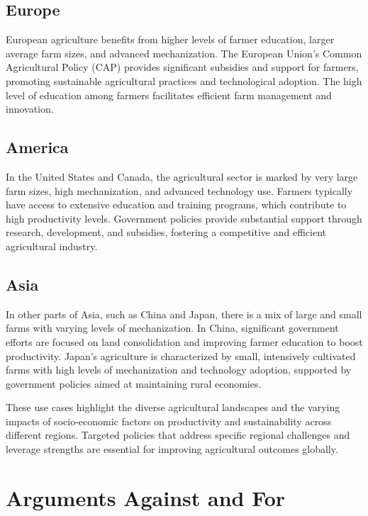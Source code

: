 \documentclass[12pt]{article}
\begin{document}
\subsection{Europe}
European agriculture benefits from higher levels of farmer education, larger average farm sizes, and advanced mechanization. The European Union's Common Agricultural Policy (CAP) provides significant subsidies and support for farmers, promoting sustainable agricultural practices and technological adoption. The high level of education among farmers facilitates efficient farm management and innovation.

\subsection{America}
In the United States and Canada, the agricultural sector is marked by very large farm sizes, high mechanization, and advanced technology use. Farmers typically have access to extensive education and training programs, which contribute to high productivity levels. Government policies provide substantial support through research, development, and subsidies, fostering a competitive and efficient agricultural industry.

\subsection{Asia}
In other parts of Asia, such as China and Japan, there is a mix of large and small farms with varying levels of mechanization. In China, significant government efforts are focused on land consolidation and improving farmer education to boost productivity. Japan's agriculture is characterized by small, intensively cultivated farms with high levels of mechanization and technology adoption, supported by government policies aimed at maintaining rural economies.

These use cases highlight the diverse agricultural landscapes and the varying impacts of socio-economic factors on productivity and sustainability across different regions. Targeted policies that address specific regional challenges and leverage strengths are essential for improving agricultural outcomes globally.

\section{Arguments Against and For}
\end{document}
